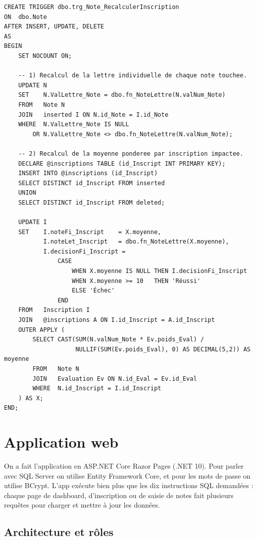 \documentclass[11pt,a4paper]{article}
\begin{document}
\begin{lstlisting}[caption={Extrait de \texttt{T-SQL.sql} --- déclencheur de recalcul}]
CREATE TRIGGER dbo.trg_Note_RecalculerInscription
ON  dbo.Note
AFTER INSERT, UPDATE, DELETE
AS
BEGIN
    SET NOCOUNT ON;

    -- 1) Recalcul de la lettre individuelle de chaque note touchee.
    UPDATE N
    SET    N.ValLettre_Note = dbo.fn_NoteLettre(N.valNum_Note)
    FROM   Note N
    JOIN   inserted I ON N.id_Note = I.id_Note
    WHERE  N.ValLettre_Note IS NULL
        OR N.ValLettre_Note <> dbo.fn_NoteLettre(N.valNum_Note);

    -- 2) Recalcul de la moyenne ponderee par inscription impactee.
    DECLARE @inscriptions TABLE (id_Inscript INT PRIMARY KEY);
    INSERT INTO @inscriptions (id_Inscript)
    SELECT DISTINCT id_Inscript FROM inserted
    UNION
    SELECT DISTINCT id_Inscript FROM deleted;

    UPDATE I
    SET    I.noteFi_Inscript    = X.moyenne,
           I.noteLet_Inscript   = dbo.fn_NoteLettre(X.moyenne),
           I.decisionFi_Inscript =
               CASE
                   WHEN X.moyenne IS NULL THEN I.decisionFi_Inscript
                   WHEN X.moyenne >= 10   THEN 'Réussi'
                   ELSE 'Échec'
               END
    FROM   Inscription I
    JOIN   @inscriptions A ON I.id_Inscript = A.id_Inscript
    OUTER APPLY (
        SELECT CAST(SUM(N.valNum_Note * Ev.poids_Eval) /
                    NULLIF(SUM(Ev.poids_Eval), 0) AS DECIMAL(5,2)) AS moyenne
        FROM   Note N
        JOIN   Evaluation Ev ON N.id_Eval = Ev.id_Eval
        WHERE  N.id_Inscript = I.id_Inscript
    ) AS X;
END;
\end{lstlisting}


\section{Application web}

On a fait l'application en ASP.NET Core Razor Pages (.NET 10). Pour
parler avec SQL Server on utilise Entity Framework Core, et pour les
mots de passe on utilise BCrypt. L'app exécute bien plus que les dix
instructions SQL demandées : chaque page de dashboard, d'inscription
ou de saisie de notes fait plusieurs requêtes pour charger et mettre
à jour les données.

\subsection{Architecture et rôles}
\end{document}
